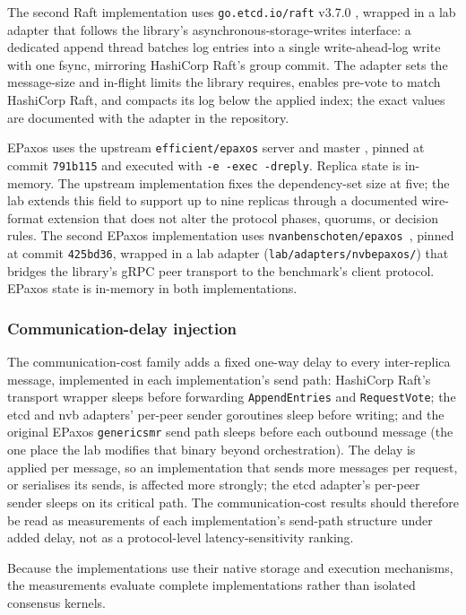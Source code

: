 The second Raft implementation uses \texttt{go.etcd.io/raft} v3.7.0
\cite{etcdraft}, wrapped in a lab adapter that follows the library's
asynchronous-storage-writes interface: a dedicated append thread batches log
entries into a single write-ahead-log write with one fsync, mirroring
HashiCorp Raft's group commit. The adapter sets the message-size and
in-flight limits the library requires, enables pre-vote to match HashiCorp
Raft, and compacts its log below the applied index; the exact values are
documented with the adapter in the repository.

EPaxos uses the upstream \texttt{efficient/epaxos} server and master
\cite{moraru2013epaxos}, pinned at commit \texttt{791b115} and executed with
\texttt{-e -exec -dreply}. Replica state is in-memory. The upstream
implementation fixes the dependency-set size at five; the lab extends this
field to support up to nine replicas through a documented wire-format
extension that does not alter the protocol phases, quorums, or decision
rules. The second EPaxos implementation uses
\texttt{nvanbenschoten/epaxos}~\cite{nvbepaxos}, pinned at commit
\texttt{425bd36}, wrapped in a lab adapter
(\texttt{lab/adapters/nvbepaxos/}) that bridges the library's gRPC peer
transport to the benchmark's client protocol. EPaxos state is in-memory in
both implementations.

\subsubsection{Communication-delay injection}

The communication-cost family adds a fixed one-way delay to every
inter-replica message, implemented in each implementation's send path:
HashiCorp Raft's transport wrapper sleeps before forwarding
\texttt{AppendEntries} and \texttt{RequestVote}; the etcd and nvb adapters'
per-peer sender goroutines sleep before writing; and the original EPaxos
\texttt{genericsmr} send path sleeps before each outbound message (the one
place the lab modifies that binary beyond orchestration). The delay is
applied per message, so an implementation that sends more messages per
request, or serialises its sends, is affected more strongly; the etcd
adapter's per-peer sender sleeps on its critical path. The
communication-cost results should therefore be read as measurements of each
implementation's send-path structure under added delay, not as a
protocol-level latency-sensitivity ranking.

Because the implementations use their native storage and execution
mechanisms, the measurements evaluate complete implementations rather than
isolated consensus kernels.

